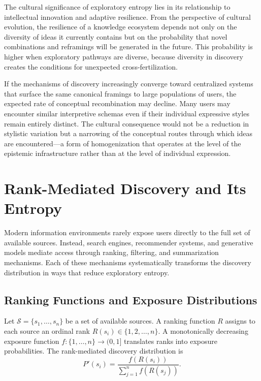 \documentclass[12pt,a4paper]{article}
\theoremstyle{definition}
\theoremstyle{plain}
\theoremstyle{remark}
\newcommand{\calS}{\mathcal{S}}
\begin{document}
The cultural significance of exploratory entropy lies in its relationship to intellectual
innovation and adaptive resilience. From the perspective of cultural evolution, the resilience
of a knowledge ecosystem depends not only on the diversity of ideas it currently contains but
on the probability that novel combinations and reframings will be generated in the future. This
probability is higher when exploratory pathways are diverse, because diversity in discovery
creates the conditions for unexpected cross-fertilization.

If the mechanisms of discovery increasingly converge toward centralized systems that surface
the same canonical framings to large populations of users, the expected rate of conceptual
recombination may decline. Many users may encounter similar interpretive schemas even if their
individual expressive styles remain entirely distinct. The cultural consequence would not be a
reduction in stylistic variation but a narrowing of the conceptual routes through which ideas
are encountered---a form of homogenization that operates at the level of the epistemic
infrastructure rather than at the level of individual expression.

\section{Rank-Mediated Discovery and Its Entropy}
\label{sec:rank}

Modern information environments rarely expose users directly to the full set of available
sources. Instead, search engines, recommender systems, and generative models mediate access
through ranking, filtering, and summarization mechanisms. Each of these mechanisms
systematically transforms the discovery distribution in ways that reduce exploratory entropy.

\subsection{Ranking Functions and Exposure Distributions}

Let $\calS = \{s_1, \ldots, s_n\}$ be a set of available sources. A ranking function $R$
assigns to each source an ordinal rank $R(s_i) \in \{1, 2, \ldots, n\}$. A monotonically
decreasing exposure function $f : \{1,\ldots,n\} \to (0,1]$ translates ranks into exposure
probabilities. The rank-mediated discovery distribution is
\[
P'(s_i) = \frac{f(R(s_i))}{\sum_{j=1}^n f(R(s_j))}.
\]
\end{document}
